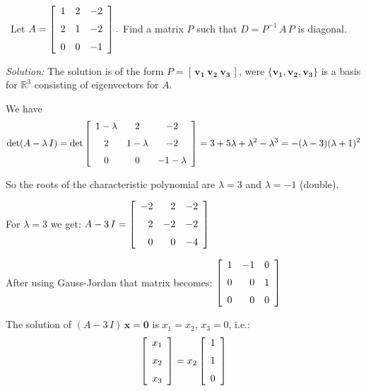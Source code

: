 \documentclass[12pt]{article}
\newcommand{\solution}[2]{\ifthenelse{\boolean{showsol}}%
{\vskip10pt\noindent\emph{Solution:}\vskip10pt #2}{\vskip #1}}
\newcounter{question}
\newcommand{\question}{\addtocounter{question}{1}%
                          \pnum{\thequestion}\ }
\newcommand{\pnum}[1]{\noindent {\hskip -18pt \bfseries #1.}}
\begin{document}
\clearpage


\question Let 
$\displaystyle{ A=\left [\begin {array}{ccc}
1&2&-2\\\noalign{\medskip}2&1&-2 \\\noalign{\medskip}0&0&-1
\end{array}\right ].}$ 
Find a matrix $P$ such that $D = P^{-1}\,A\,P$ 
is diagonal.

\solution{3in}{ 
The solution is of the form $P = [\,\mathbf{v_1\ v_2\ v_3}\,]$, 
were $\{\mathbf{v_1},\mathbf{v_2},\mathbf{v_3}\}$ is a 
basis for $\mathbb{R}^3$ consisting of eigenvectors for $A$.

We have
\[
\det(A-\lambda\,I) = 
\det\left [\begin {array}{ccc} 1-\lambda&2&-2\\\noalign{\medskip}2&1-
\lambda&-2\\\noalign{\medskip}0&0&-1-\lambda\end {array}\right ] =
3 + 5\lambda +\lambda^2 - \lambda^3
= - (\lambda - 3)(\lambda + 1)^2
\]

So the roots of the characteristic polynomial are $\lambda=3$ and
$\lambda=-1$ (double).

For $\lambda=3$ we get:
$\displaystyle{A - 3\,I =
\left [\begin {array}{rrr} -2&2&-2\\\noalign{\medskip}2&-2&-2
\\\noalign{\medskip}0&0&-4\end {array}\right ]
}$

After using Gauss-Jordan that matrix becomes: 
$\displaystyle{
\left [\begin {array}{rrr} 1&-1&0\\\noalign{\medskip}0&0&1
\\\noalign{\medskip}0&0&0\end {array}\right ]
}$

The solution of $(A-3\,I)\,\mathbf{x} = \mathbf{0}$ is
$x_1=x_2$, $x_3=0$, i.e.:
\[
\left [\begin {array}{r} x_{{1}}\\\noalign{\medskip}x_{{2}}
\\\noalign{\medskip}x_{{3}}\end {array}\right ]=x_{{2}}\left [
\begin {array}{r} 1\\\noalign{\medskip}1\\\noalign{\medskip}0
\end {array}\right ]
\]

}
\end{document}
